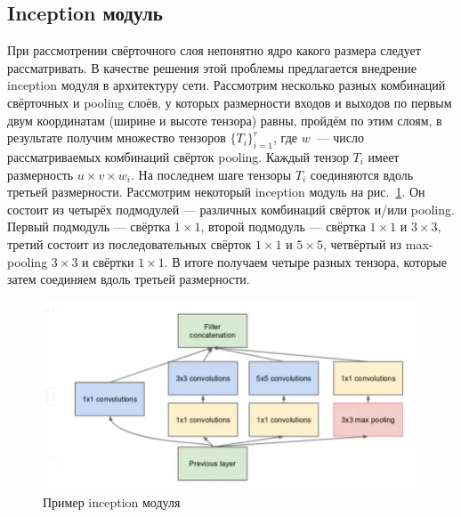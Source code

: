 \documentclass{article}
\theoremstyle{definition}
\theoremstyle{theorem}
\theoremstyle{remark}
\theoremstyle{theorem}
\theoremstyle{example}
\theoremstyle{theorem}
\theoremstyle{theorem}
\theoremstyle{theorem}
\theoremstyle{theorem}
\begin{document}
	\subsection{ Inception модуль}
		При рассмотрении свёрточного слоя непонятно ядро какого размера следует рассматривать. В качестве решения этой проблемы предлагается внедрение inception модуля в архитектуру сети. Рассмотрим несколько разных комбинаций свёрточных и pooling слоёв, у которых размерности входов и выходов по первым двум координатам (ширине и высоте тензора) равны, пройдём по этим слоям, в результате получим множество тензоров $\{T_i\}_{i=1}^r$, где $w$~--- число рассматриваемых комбинаций свёрток pooling. Каждый тензор $T_i$ имеет размерность $u\times v\times w_i$. На последнем шаге тензоры $T_i$ соединяются вдоль третьей размерности. Рассмотрим некоторый inception модуль на рис.~\ref{inception}. Он состоит из четырёх подмодулей --- различных комбинаций свёрток и/или pooling. Первый подмодуль --- свёртка $1\times1$, второй подмодуль --- свёртка $1\times1$ и $3\times3$, третий состоит из последовательных свёрток $1\times1$ и $5\times5$,  четвёртый из max-pooling $3\times3$ и свёртки $1\times1$. В итоге получаем четыре разных тензора, которые затем соединяем вдоль третьей размерности. 
		\newpage
		\begin{figure}[h!]\label{inception}
			\includegraphics[width=\textwidth]{img/inception.png}\caption{Пример inception модуля}
		\end{figure}
\end{document}
